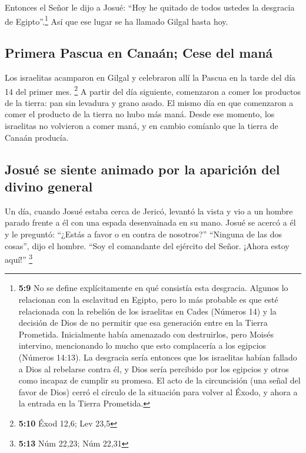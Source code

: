  Entonces el Señor le dijo a Josué: ``Hoy he quitado de
todos ustedes la desgracia de Egipto''.\footnote{\textbf{5:9} No se
  define explícitamente en qué consistía esta desgracia. Algunos lo
  relacionan con la esclavitud en Egipto, pero lo más probable es que
  esté relacionada con la rebelión de los israelitas en Cades (Números
  14) y la decisión de Dios de no permitir que esa generación entre en
  la Tierra Prometida. Inicialmente había amenazado con destruirlos,
  pero Moisés intervino, mencionando lo mucho que esto complacería a los
  egipcios (Números 14:13). La desgracia sería entonces que los
  israelitas habían fallado a Dios al rebelarse contra él, y Dios sería
  percibido por los egipcios y otros como incapaz de cumplir su promesa.
  El acto de la circuncisión (una señal del favor de Dios) cerró el
  círculo de la situación para volver al Éxodo, y ahora a la entrada en
  la Tierra Prometida.} Así que ese lugar se ha llamado Gilgal hasta
hoy.

\hypertarget{primera-pascua-en-canauxe1n-cese-del-manuxe1}{%
\subsection{Primera Pascua en Canaán; Cese del
maná}\label{primera-pascua-en-canauxe1n-cese-del-manuxe1}}

 Los israelitas acamparon en Gilgal y celebraron allí la
Pascua en la tarde del día 14 del primer mes. \footnote{\textbf{5:10}
  Éxod 12,6; Lev 23,5}  A partir del día siguiente,
comenzaron a comer los productos de la tierra: pan sin levadura y grano
asado.  El mismo día en que comenzaron a comer el
producto de la tierra no hubo más maná. Desde ese momento, los
israelitas no volvieron a comer maná, y en cambio comíanlo que la tierra
de Canaán producía.

\hypertarget{josuuxe9-se-siente-animado-por-la-apariciuxf3n-del-divino-general}{%
\subsection{Josué se siente animado por la aparición del divino
general}\label{josuuxe9-se-siente-animado-por-la-apariciuxf3n-del-divino-general}}

 Un día, cuando Josué estaba cerca de Jericó, levantó la
vista y vio a un hombre parado frente a él con una espada desenvainada
en su mano. Josué se acercó a él y le preguntó: ``¿Estás a favor o en
contra de nosotros?'' ``Ninguna de las dos cosas'', dijo el hombre.
``Soy el comandante del ejército del Señor. ¡Ahora estoy aquí!''
\footnote{\textbf{5:13} Núm 22,23; Núm 22,31}

